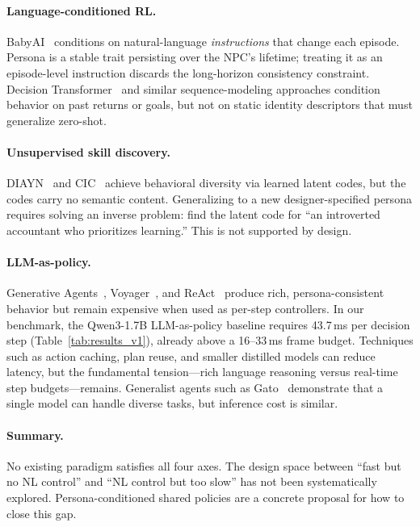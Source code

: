 \documentclass[conference]{IEEEtran}
\begin{document}
\paragraph{Language-conditioned RL.}
BabyAI~\cite{chevalier2019babyai} conditions on natural-language
\emph{instructions} that change each episode.
Persona is a stable trait persisting over the NPC's lifetime; treating it as an
episode-level instruction discards the long-horizon consistency constraint.
Decision Transformer~\cite{chen2021decision} and similar sequence-modeling
approaches condition behavior on past returns or goals, but not on static identity
descriptors that must generalize zero-shot.

\paragraph{Unsupervised skill discovery.}
DIAYN~\cite{eysenbach2018diayn} and CIC~\cite{laskin2022cic} achieve behavioral
diversity via learned latent codes, but the codes carry no semantic content.
Generalizing to a new designer-specified persona requires solving an inverse
problem: find the latent code for ``an introverted accountant who prioritizes
learning.'' This is not supported by design.

\paragraph{LLM-as-policy.}
Generative Agents~\cite{park2023generative}, Voyager~\cite{wang2023voyager},
and ReAct~\cite{yao2023react} produce rich, persona-consistent behavior but
remain expensive when used as per-step controllers. In our benchmark, the
Qwen3-1.7B LLM-as-policy baseline requires 43.7\,ms per decision step
(Table~\ref{tab:results_v1}), already above a 16--33\,ms frame budget.
Techniques such as action caching, plan reuse, and smaller distilled models can
reduce latency, but the fundamental tension---rich language reasoning versus
real-time step budgets---remains. Generalist agents such as
Gato~\cite{reed2022gato} demonstrate that a single model can handle diverse
tasks, but inference cost is similar.

\paragraph{Summary.}
No existing paradigm satisfies all four axes. The design space between
``fast but no NL control'' and ``NL control but too slow'' has not been
systematically explored. Persona-conditioned shared policies are a concrete
proposal for how to close this gap.
\end{document}
